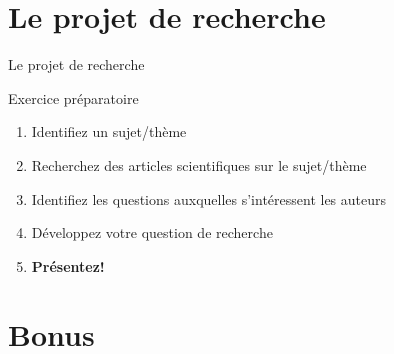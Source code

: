 \documentclass[10pt]{beamer}
\begin{document}



\section{Le projet de recherche}

\begin{frame}{Le projet de recherche}
    \begin{block}{Exercice préparatoire}
    \end{block}
    \begin{enumerate}
        \item Identifiez un sujet/thème
        \item Recherchez des articles scientifiques sur le sujet/thème
        \item Identifiez les questions auxquelles s'intéressent les auteurs
        \item Développez votre question de recherche
        \item \textbf{Présentez!}
    \end{enumerate}
\end{frame}

\section{Bonus}

\maketitle
\end{document}
